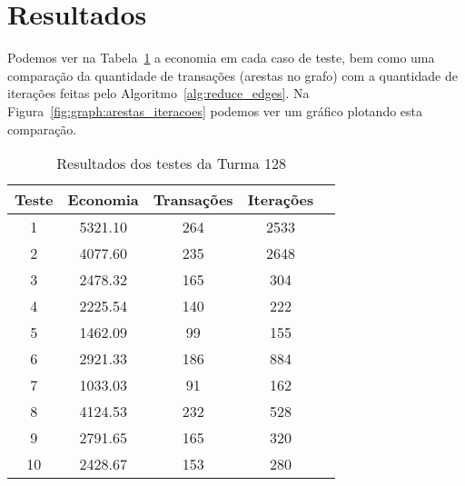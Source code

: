 \documentclass[12pt]{article}
\begin{document}
\section{Resultados}\label{sec:resultados}

Podemos ver na Tabela~\ref{tab:resultados} a economia em cada caso de teste, bem
como uma comparação da quantidade de transações (arestas no grafo) com a
quantidade de iterações feitas pelo Algoritmo~\ref{alg:reduce_edges}. Na
Figura~\ref{fig:graph:arestas_iteracoes} podemos ver um gráfico plotando esta comparação.

\begin{table}[H]
  \centering
\begin{tabular}{||c|c||c|c|c||}
  \hline
Teste & Economia & Transações & Iterações \\ [0.5ex]
  \hline\hline
  1 & 5321.10 & 264 & 2533 \\
  \hline
  2 & 4077.60 & 235 & 2648 \\
  \hline
  3 & 2478.32 & 165 & 304 \\
  \hline
  4 & 2225.54 & 140 & 222 \\
  \hline
  5 & 1462.09  & 99 & 155 \\
  \hline
  6 & 2921.33 & 186 & 884 \\
  \hline
  7 & 1033.03  & 91 & 162 \\
  \hline
  8 & 4124.53 & 232 & 528 \\
  \hline
  9 & 2791.65 & 165 & 320 \\
  \hline
  10 & 2428.67 & 153 & 280 \\
\hline
\end{tabular}

\caption{Resultados dos testes da Turma 128}
\label{tab:resultados}
\end{table}

\label{fig:graph:arestas_iteracoes}
\end{document}
